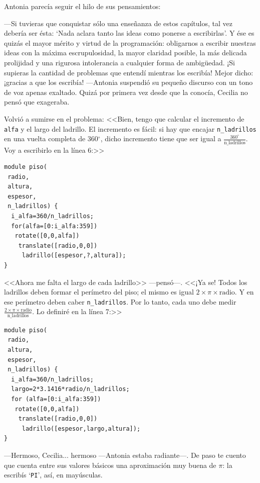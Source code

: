 Antonia parecía seguir el hilo de sus pensamientos:

---Si tuvieras que conquistar sólo una enseñanza de estos capítulos,
tal vez debería ser ésta: `Nada aclara tanto las ideas como ponerse a
escribirlas'. Y ése es quizás el mayor mérito y virtud de la
programación: obligarnos a escribir nuestras ideas con la máxima
escrupulosidad, la mayor claridad posible, la más delicada prolijidad
y una rigurosa intolerancia a cualquier forma de ambigüedad. ¡Si
supieras la cantidad de problemas que entendí mientras los escribía!
Mejor dicho: ¡gracias a que los escribía!  ---Antonia suspendió su
pequeño discurso con un tono de voz apenas exaltado. Quizá por primera
vez desde que la conocía, Cecilia no pensó que exageraba.

Volvió a sumirse en el problema: <<Bien, tengo que calcular el
incremento de \texttt{alfa} y el largo del ladrillo. El incremento es
fácil: si hay que encajar \texttt{n\_ladrillos} en una vuelta completa
de 360$^{\circ}$, dicho incremento tiene que ser igual a
$\frac{360^{\circ}}{\text{n\_ladrillos}}$. Voy a escribirlo en la
línea 6:>>


    \begin{lstlisting}
module piso(
 radio,
 altura,
 espesor,
 n_ladrillos) {
  i_alfa=360/n_ladrillos;
  for(alfa=[0:i_alfa:359])
   rotate([0,0,alfa])
    translate([radio,0,0])
     ladrillo([espesor,?,altura]); 
}
    \end{lstlisting}

    <<Ahora me falta el largo de cada ladrillo>> ---pensó---.  <<¡Ya
    se! Todos los ladrillos deben formar el perímetro del piso; el
    mismo es igual $2\times \pi \times \text{radio}$. Y en ese perímetro
    deben caber \texttt{n\_ladrillos}. Por lo tanto, cada uno debe
    medir $\frac{2\times \pi \times
      \text{radio}}{\text{n\_ladrillos}}$. Lo definiré en la línea
    7:>>


    \begin{lstlisting}
module piso(
 radio,
 altura,
 espesor,
 n_ladrillos) {
  i_alfa=360/n_ladrillos;
  largo=2*3.1416*radio/n_ladrillos; 
  for (alfa=[0:i_alfa:359])
   rotate([0,0,alfa])
    translate([radio,0,0])
     ladrillo([espesor,largo,altura]); 
}
    \end{lstlisting}

    ---Hermoso, Cecilia... hermoso ---Antonia estaba ra\-dian\-te---.
    De paso te cuento que \openscad{} cuenta entre sus valores básicos
    una aproximación muy buena de $\pi$: la escribís `\texttt{PI}',
    así, en mayúsculas.


